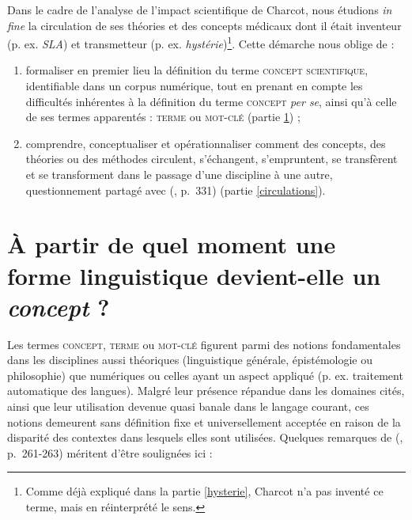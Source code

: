 Dans le cadre de l'analyse de l'impact scientifique de Charcot, nous étudions \textit{in fine} la circulation de ses théories et des concepts médicaux dont il était inventeur (p. ex. \textit{SLA}) et transmetteur (p. ex. \textit{hystérie})\footnote{Comme déjà expliqué dans la partie \ref{hysterie}, Charcot n'a pas inventé ce terme, mais en réinterprété le sens.}. Cette démarche nous oblige de :
\begin{enumerate}
\item formaliser en premier lieu la définition du terme \textsc{concept scientifique}, identifiable dans un corpus numérique, tout en prenant en compte les difficultés inhérentes à la définition du terme \textsc{concept} \textit{per se}, ainsi qu'à celle de ses termes apparentés : \textsc{terme} ou \textsc{mot-clé} (partie \ref{concept}) ;
\item comprendre, conceptualiser et opérationnaliser \og{}comment des concepts, des théories ou des méthodes circulent, s'échangent, s'empruntent, se transfèrent et se transforment dans le passage d'une discipline à une autre\fg{}, questionnement partagé avec \citeauthor{landais2014frederic} (\citeyear{landais2014frederic}, p.~331) (partie \ref{circulations}).
\end{enumerate}



\section{À partir de quel moment une forme linguistique devient-elle un \textit{concept} ?}
\label{concept}

Les termes \textsc{concept}, \textsc{terme} ou \textsc{mot-clé} figurent parmi des notions fondamentales dans les disciplines aussi théoriques (linguistique générale, épistémologie ou philosophie) que numériques ou celles ayant un aspect appliqué (p. ex. traitement automatique des langues). 
Malgré leur présence répandue dans les domaines cités, ainsi que leur utilisation devenue quasi banale dans le langage courant, ces notions demeurent sans définition fixe et universellement acceptée en raison de la disparité des contextes dans lesquels elles sont utilisées. Quelques remarques de \citeauthor{Lecourt1999} (\citeyear{Lecourt1999}, p.~261-263) méritent d'être soulignées ici :

